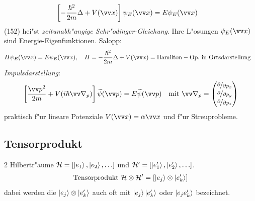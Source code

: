 \documentclass[a4paper]{scrartcl}
\newcommand{\matr}[1]{\begin{pmatrix} #1 \end{pmatrix}}
\begin{document}
{\begin{align}
\left[ -\frac{\hbar^2}{2m} \Delta + V(\vv x) \right] \psi_E(\vv x) & = E \psi_E(\vv x)
\end{align}
(152) hei"st \emph{zeitunabh"angige Schr"odinger-Gleichung}. Ihre L"osungen $\psi_E(\vv x)$ sind Energie-Eigenfunktionen. Salopp:
\begin{align}
H \psi_E(\vv x) & = E \psi_E(\vv x), \quad H = - \frac{\hbar^2}{2m} \Delta + V(\vv x) = \mathrm{Hamilton-Op. \ in \ Ortsdarstellung}
\end{align}
\emph{Impulsdarstellung}:
\begin{align}
\left[ \frac{\vv p^2}{2m} + V(i\hbar \vv \nabla_p) \right] \widetilde \psi (\vv p) = E \widetilde \psi(\vv p) \quad \mathrm{mit \ } \vv \nabla_p = \matr{ \nicefrac \partial {\partial p_x} \\ \nicefrac \partial {\partial p_y} \\ \nicefrac \partial {\partial p_z}}  
\end{align}
praktisch f"ur lineare Potenziale $V(\vv x) = \alpha \vv x$ und f"ur Streuprobleme.

\subsection{Tensorprodukt}

2 Hilbertr"aume $\mathcal H = \left[ \ket{e_1}, \ket{e_2}, \ldots \right]$ und $\mathcal H' = \left[ \ket{e_1'}, \ket{e_2'}, \ldots \right]$.
\begin{align}
\mathrm{Tensorprodukt \ } \mathcal H \otimes \mathcal H' = \left[ \ket{e_j} \otimes \ket{e_k'} \right]
\end{align}
dabei werden die $\ket{e_j} \otimes \ket{e_k'}$ auch oft mit $\ket{e_j} \ket{e_k'}$ oder $\ket{ e_j e_k'}$ bezeichnet.

}
\end{document}
